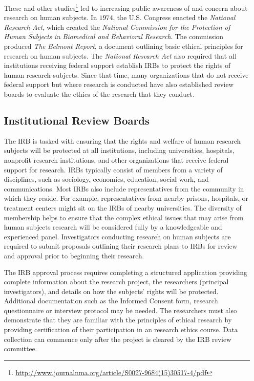 These and other studies\footnote{\url{http://www.journalnma.org/article/S0027-9684(15)30517-4/pdf}} led to increasing public awareness of and concern about research on human subjects. In $ 1974 $, the U.S. Congress enacted the \textit{National Research Act}, which created the \textit{National Commission for the Protection of Human Subjects in Biomedical and Behavioral Research}. The commission produced \textit{The Belmont Report}\cite{national1978belmont}, a document outlining basic ethical principles for research on human subjects. The \textit{National Research Act} also required that all institutions receiving federal support establish \acp{IRB} to protect the rights of human research subjects. Since that time, many organizations that do not receive federal support but where research is conducted have also established review boards to evaluate the ethics of the research that they conduct.

\subsection{Institutional Review Boards}

The \acf{IRB} is tasked with ensuring that the rights and welfare of human research subjects will be protected at all institutions, including universities, hospitals, nonprofit research institutions, and other organizations that receive federal support for research. \acp{IRB} typically consist of members from a variety of disciplines, such as sociology, economics, education, social work, and communications. Most \acp{IRB} also include representatives from the community in which they reside. For example, representatives from nearby prisons, hospitals, or treatment centers might sit on the \acp{IRB} of nearby universities. The diversity of membership helps to ensure that the complex ethical issues that may arise from human subjects research will be considered fully by a knowledgeable and experienced panel. Investigators conducting research on human subjects are required to submit proposals outlining their research plans to \acp{IRB} for review and approval prior to beginning their research. 

The \ac{IRB} approval process requires completing a structured application providing complete information about the research project, the researchers (principal investigators), and details on how the subjects' rights will be protected. Additional documentation such as the Informed Consent form, research questionnaire or interview protocol may be needed. The researchers must also demonstrate that they are familiar with the principles of ethical research by providing certification of their participation in an research ethics course. Data collection can commence only after the project is cleared by the \ac{IRB} review committee.


